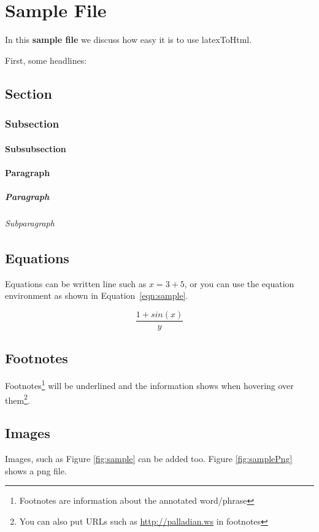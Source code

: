 \chapter{Sample File}
In this \textbf{sample file} we discuss how easy it is to use latexToHtml.

First, some headlines:

\section{Section}
\subsection{Subsection}
\subsubsection{Subsubsection}
\subsubsection{Paragraph}
\paragraph{Paragraph}
\subparagraph{Subparagraph}

\label{sec:equation}
\section{Equations} 

Equations can be written line such as $x = 3 + 5$, or you can use the equation environment as shown in Equation~\ref{eqn:sample}.

\begin{equation}
\label{eqn:sample}
\frac{1+sin(x)}{y}
\end{equation}

\thiswontshow

\section{Footnotes}  
Footnotes\footnote{Footnotes are information about the annotated word/phrase} will be underlined and the information shows when hovering over them\footnote{You can also put URLs such as \url{http://palladian.ws} in footnotes}.

\section{Images}
Images, such as Figure \ref{fig:sample} can be added too. Figure \ref{fig:samplePng} shows a png file. 

